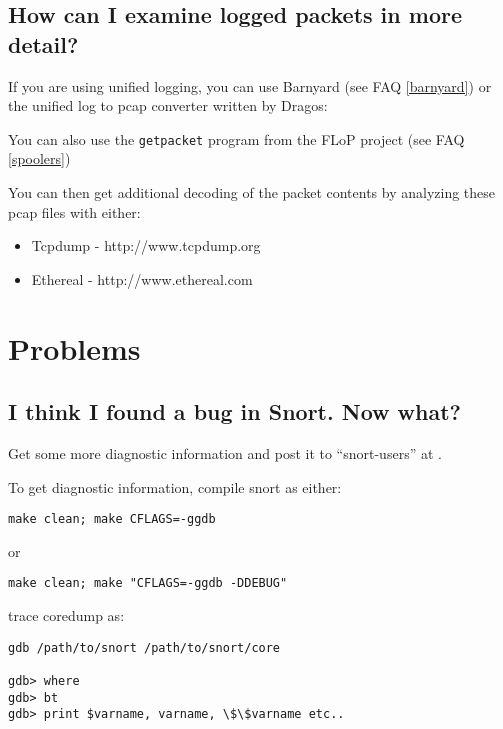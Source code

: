 \documentclass{article}
\newcommand{\myref}[1]{(see FAQ \ref{#1})}
\begin{document}
\subsection{How can I examine logged packets in more detail?}

If you are using unified logging, you can use Barnyard \myref{barnyard} or the unified log to pcap converter written by Dragos:


You can also use the \texttt{getpacket} program from the FLoP project \myref{spoolers}

You can then get additional decoding of the packet contents by analyzing these
pcap files with either:
\begin{itemize}
  \item Tcpdump - http://www.tcpdump.org
  \item Ethereal - http://www.ethereal.com
\end{itemize}

\section{Problems}
\subsection{ I think I found a bug in Snort. Now what?}

Get some more diagnostic information and post it to ``snort-users'' at
.

To get diagnostic information, compile snort as either:

\begin{verbatim}make clean; make CFLAGS=-ggdb\end{verbatim}

or
\begin{verbatim}make clean; make "CFLAGS=-ggdb -DDEBUG" \end{verbatim}

trace coredump as:

\begin{verbatim}
gdb /path/to/snort /path/to/snort/core

gdb> where
gdb> bt 
gdb> print $varname, varname, \$\$varname etc..
\end{verbatim}
\end{document}
